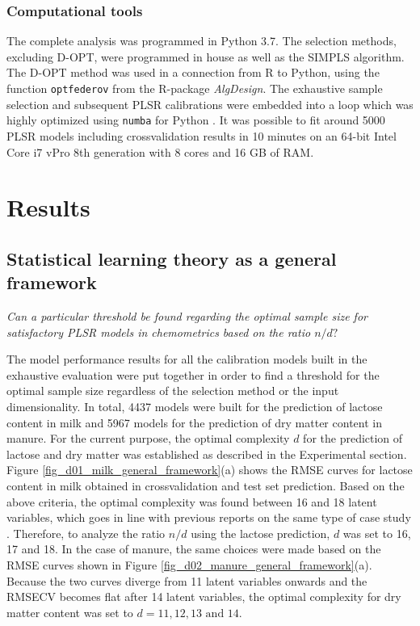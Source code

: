\documentclass[journal=ancham,manuscript=article]{achemso}
\begin{document}
\subsubsection{Computational tools}

The complete analysis was programmed in Python 3.7. The selection methods, excluding D-OPT, were programmed in house as well as the SIMPLS algorithm. The D-OPT method was used in a connection from R to Python, using the function \texttt{optfederov} from the R-package \emph{AlgDesign}\cite{Wheeler2019}. The exhaustive sample selection and subsequent PLSR calibrations were embedded into a loop which was highly optimized using \texttt{numba} for Python \cite{Lam2015}. It was possible to fit around 5000 PLSR models including crossvalidation results in 10 minutes on an 64-bit Intel Core i7 vPro 8th generation with 8 cores and 16 GB of RAM. 



\section*{Results}\label{results}

\subsection*{Statistical learning theory as a general framework}\label{results:genframework}

\emph{Can a particular threshold be found regarding the optimal sample size for satisfactory PLSR models in chemometrics based on the ratio $n/d?$}

The model performance results for all the calibration models built in the exhaustive evaluation were put together in order to find a threshold for the optimal sample size regardless of the selection method or the input dimensionality. In total, 4437 models were built for the prediction of lactose content in milk and 5967 models for the prediction of dry matter content in manure. For the current purpose, the optimal complexity $d$ for the prediction of lactose and dry matter was established as described in the Experimental section. Figure \ref{fig_d01_milk_general_framework}(a) shows the RMSE curves for lactose content in milk obtained in crossvalidation and test set prediction. Based on the above criteria, the optimal complexity was found between 16 and 18 latent variables, which goes in line with previous reports on the same type of case study \cite{Diaz-Olivares2020}. Therefore, to analyze the ratio $n/d$ using the lactose prediction, $d$ was set to 16, 17 and 18. In the case of manure, the same choices were made based on the RMSE curves shown in Figure \ref{fig_d02_manure_general_framework}(a). Because the two curves diverge from 11 latent variables onwards and the RMSECV becomes flat after 14 latent variables, the optimal complexity for dry matter content was set to $d = 11,12,13 \text{ and } 14$\cite{Saeys2005}. 
\end{document}
